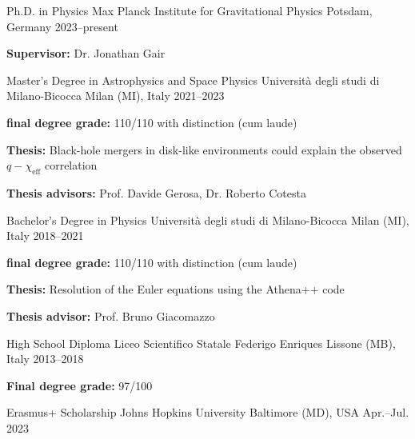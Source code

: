 


\begin{cventries}
\cventry
{Ph.D. in Physics} %
{Max Planck Institute for Gravitational Physics} %
{Potsdam, Germany} %
{2023--present} %
{ %
\begin{cvitems}
	\item {\textbf{Supervisor:} Dr. Jonathan Gair}
\end{cvitems}
}
\cventry
{Master's Degree in Astrophysics and Space Physics} %
{Università degli studi di Milano-Bicocca} %
{Milan (MI), Italy} %
{2021--2023} %
{ %
\begin{cvitems}
	\item {\textbf{final degree grade:} 110/110 with distinction (cum laude)}
	\item {\textbf{Thesis:} Black-hole mergers in disk-like environments could explain  the observed $q-\chi_\mathrm{eff}$ correlation}
	\item {\textbf{Thesis advisors:} Prof. Davide Gerosa, Dr. Roberto Cotesta}
\end{cvitems}
}

\cventry
{Bachelor's Degree in Physics} %
{Università degli studi di Milano-Bicocca} %
{Milan (MI), Italy} %
{2018--2021} %
{ %
\begin{cvitems}
	\item {\textbf{final degree grade:} 110/110 with distinction (cum laude)}
	\item {\textbf{Thesis:} Resolution of the Euler equations using the Athena++ code}
	\item {\textbf{Thesis advisor:} Prof. Bruno Giacomazzo}
\end{cvitems}
}

\cventry
{High School Diploma} %
{Liceo Scientifico Statale Federigo Enriques} %
{Lissone (MB), Italy} %
{2013--2018} %
{ %
\begin{cvitems}
	\item {\textbf{Final degree grade:} 97/100}
\end{cvitems}
}
\end{cventries}


\begin{cventries}

\cventry
{Erasmus+ Scholarship} %
{Johns Hopkins University} %
{Baltimore (MD), USA} %
{Apr.--Jul. 2023} %
{}

\end{cventries}